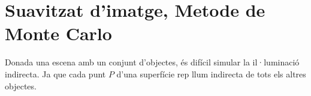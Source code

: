\documentclass{article}
\begin{document}
\section{Suavitzat d'imatge, Metode de Monte Carlo}
Donada una escena amb un conjunt d'objectes, és difícil simular la il·luminació 
indirecta. Ja que cada punt $P$ d'una superfície
rep llum indirecta de tots els altres objectes. 
\begin{figure}[h]
   \centering
   

\begin{tikzpicture}[x=0.75pt,y=0.75pt,yscale=-0.8,xscale=0.8]


\end{tikzpicture}
\end{figure}
\end{document}
